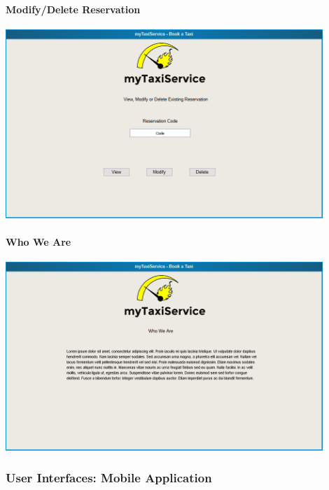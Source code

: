 		\paragraph{Modify/Delete Reservation}
		\begin{center}
			\includegraphics[width=0.90\textwidth]{./images/modify_delete_reservation}
		\end{center}
		\paragraph{Who We Are}
		\begin{center}
			\includegraphics[width=0.90\textwidth]{./images/who_we_are}
		\end{center}
		
		\subsubsection{User Interfaces: Mobile Application}
